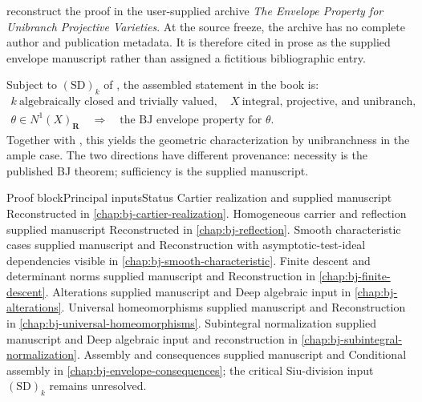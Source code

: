reconstruct the proof in the user-supplied archive
\emph{The Envelope Property for Unibranch Projective Varieties}.  At the
source freeze, the archive has no complete author and publication metadata.
It is therefore cited in prose as the supplied envelope manuscript rather
than assigned a fictitious bibliographic entry.

Subject to $\mathrm{(SD)}_k$ of , the
assembled statement in the book is:
\[
\begin{gathered}
k\ \text{algebraically closed and trivially valued},\quad
X\ \text{integral, projective, and unibranch},\\
\theta\in N^1(X)_{\mathbf R}
\quad\Longrightarrow\quad
\text{the BJ envelope property for }\theta .
\end{gathered}
\tag{L.5}\label{eq:appL-envelope-scope}
\]
Together with \cite[Theorem~5.12]{BJ22}, this yields the geometric
characterization by unibranchness in the ample case.  The two directions have
different provenance: necessity is the published BJ theorem; sufficiency is
the supplied manuscript.

\begin{AppLProvenanceLedger}{Proof block}{Principal inputs}{Status}
\AppLProvenanceRecord
  {Cartier realization}
  {\cite{BJ22} and supplied manuscript}
  {Reconstructed in \cref{chap:bj-cartier-realization}.}
\AppLProvenanceRecord
  {Homogeneous carrier and reflection}
  {supplied manuscript}
  {Reconstructed in \cref{chap:bj-reflection}.}
\AppLProvenanceRecord
  {Smooth characteristic cases}
  {supplied manuscript and \cite{BJ22b,MustataTest,Canton}}
  {Reconstruction with asymptotic-test-ideal dependencies visible in
   \cref{chap:bj-smooth-characteristic}.}
\AppLProvenanceRecord
  {Finite descent and determinant norms}
  {supplied manuscript and \cite{stacks-project,FerrandNorm}}
  {Reconstruction in \cref{chap:bj-finite-descent}.}
\AppLProvenanceRecord
  {Alterations}
  {supplied manuscript and \cite{deJong1996,stacks-project}}
  {Deep algebraic input in \cref{chap:bj-alterations}.}
\AppLProvenanceRecord
  {Universal homeomorphisms}
  {supplied manuscript and \cite{stacks-project,BJ22}}
  {Reconstruction in \cref{chap:bj-universal-homeomorphisms}.}
\AppLProvenanceRecord
  {Subintegral normalization}
  {supplied manuscript and \cite{RobertsSingh,stacks-project}}
  {Deep algebraic input and reconstruction in
   \cref{chap:bj-subintegral-normalization}.}
\AppLProvenanceRecord
  {Assembly and consequences}
  {supplied manuscript and \cite{BJ22}}
  {Conditional assembly in \cref{chap:bj-envelope-consequences}; the
   critical Siu-division input $\mathrm{(SD)}_k$ remains unresolved.}
\end{AppLProvenanceLedger}

